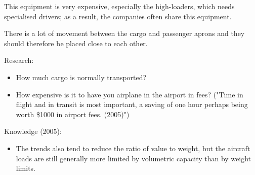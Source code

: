 This equipment is very expensive, especially the high-loaders, which needs specialised drivers; as a result, the companies often share this equipment.

There is a lot of movement between the cargo and passenger aprons and they should therefore be placed close to each other.

Research:
\begin{itemize}
\item How much cargo is normally transported?
\item How expensive is it to have you airplane in the airport in fees? ("Time in flight and in transit is most important, a saving of one hour perhaps being worth \$1000 in airport fees. (2005)")
\end{itemize}


Knowledge (2005):
\begin{itemize}
\item The trends also tend to reduce the ratio of value to weight, but the aircraft loads are still generally more limited by volumetric capacity than by weight limits.
\end{itemize}